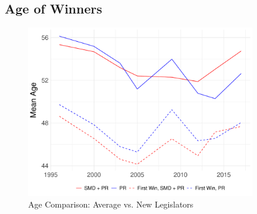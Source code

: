 \documentclass[a4paper, 11pt]{article}
\begin{document}
\newpage

\subsection{Age of Winners}

\begin{figure}[!htbp]
	\includegraphics[width = 0.9\textwidth]{../figure/paper/age_first_win.pdf}
	\caption{Age Comparison: Average vs. New Legislators}
	\label{fig:ageFirstWin}
\end{figure}	
\end{document}

